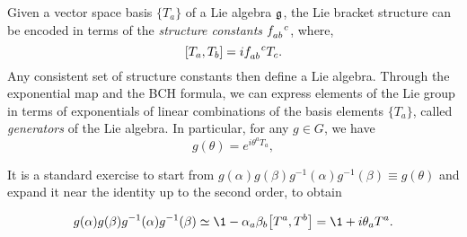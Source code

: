 Given a vector space basis $\{T_a\}$ of a Lie algebra $\mathfrak{g}$, the Lie bracket structure can be encoded in terms of the \emph{structure constants} $\tensor{f}{_a_b^c}$, where,
\begin{equation}\label{eq:structure-contants}
   \comm{T_a}{T_b} = i \tensor{f}{_a_b^c} T_c.
\end{equation}
Any consistent set of structure constants then define a Lie algebra. Through the exponential map and the BCH formula, we can express elements of the Lie group in terms of exponentials of linear combinations of the basis elements $\{T_a\}$, called \emph{generators} of the Lie algebra. In particular, for any $g \in G$, we have
\begin{equation}\label{eq:temp-7}
    g(\theta) = e^{i \theta^a T_a},
\end{equation}

It is a standard exercise to start from $g(\alpha) g(\beta) g^{-1}(\alpha) g^{-1}(\beta) \equiv g(\theta)$ and expand it near the identity up to the second order, to obtain

\begin{equation}
    g(\alpha) g(\beta) g^{-1}(\alpha) g^{-1}(\beta) \simeq \1 - \alpha_a \beta_b \comm{T^a}{T^b} = \1 + i \theta_a T^a.
\end{equation}

